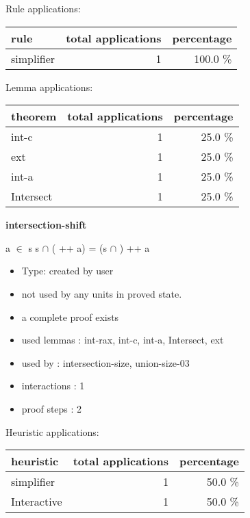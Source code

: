 \documentclass[a4paper]{article}
\begin{document}
Rule applications:

\begin{supertabular}{l|r|r}
rule	        & total applications & percentage \\ \hline
simplifier & 1 & 100.0 \% \\

\end{supertabular}

Lemma applications:

\begin{supertabular}{l|r|r}
theorem	        & total applications & percentage \\ \hline
int-c & 1 & 25.0 \% \\
ext & 1 & 25.0 \% \\
int-a & 1 & 25.0 \% \\
Intersect & 1 & 25.0 \% \\

\end{supertabular}
\pagebreak

{\LARGE\bf intersection-shift}\label{lemma-intersection-shift}

\medskip

 \Fol a $\in$ s \Imp s $\cap$ ( ++ a) = (s $\cap$ ) ++ a

\begin{itemize}

\item Type: created by user

\item not used by any units in proved state.
\item       a complete proof exists
\item       used lemmas  : int-rax, int-c, int-a, Intersect, ext
\item       used by      : intersection-size, union-size-03
\item       interactions : 1
\item       proof steps  : 2
\end{itemize}

\medskip


Heuristic applications:

\begin{supertabular}{l|r|r}
heuristic	& total applications & percentage \\ \hline
simplifier & 1 & 50.0 \% \\
Interactive & 1 & 50.0 \% \\

\end{supertabular}
\end{document}
